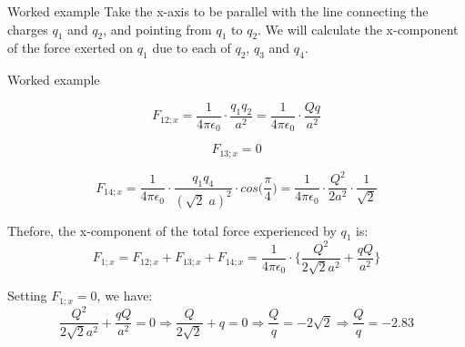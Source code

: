 {\begin{frame}{Worked example }
Take the x-axis to be parallel with the line connecting the charges
$q_1$ and $q_2$, and pointing from $q_1$ to $q_2$.
We will calculate the x-component of the force exerted on $q_1$
due to each of $q_2$, $q_3$ and $q_4$.

\end{frame}


%
%
%

\begin{frame}{Worked example }

\begin{equation*}
   F_{12;x} =
      \frac{1}{4\pi \epsilon_0} \cdot \frac{q_1 q_2}{a^2}  =
      \frac{1}{4\pi \epsilon_0} \cdot \frac{Qq}{a^2}
\end{equation*}

\begin{equation*}
   F_{13;x} = 0
\end{equation*}

\begin{equation*}
   F_{14;x} =
     \frac{1}{4\pi \epsilon_0} \cdot \frac{q_1 q_4}{(\sqrt{2} \; a)^2} \cdot cos\Big( \frac{\pi}{4} \Big) =
     \frac{1}{4\pi \epsilon_0} \cdot \frac{Q^2}{2a^2} \cdot \frac{1}{\sqrt{2}}
\end{equation*}

Thefore, the x-component of the total force experienced by $q_1$ is:
\begin{equation*}
   F_{1;x} = F_{12;x} + F_{13;x} + F_{14;x} =
    \frac{1}{4\pi \epsilon_0} \cdot
    \bigg\{
        \frac{Q^2}{2\sqrt{2}a^2}
        +\frac{qQ}{a^2}
    \bigg\}
\end{equation*}

Setting $F_{1;x} = 0$, we have:
\begin{equation*}
     \frac{Q^2}{2\sqrt{2}a^2} +\frac{qQ}{a^2} = 0 \Rightarrow
     \frac{Q}{2\sqrt{2}} +q = 0 \Rightarrow
     \frac{Q}{q} = -2\sqrt{2} \Rightarrow
     \frac{Q}{q} = -2.83
\end{equation*}

\end{frame}


} %



%
%
%

